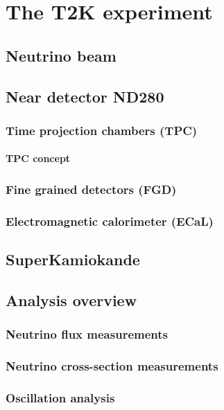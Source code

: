 \documentclass[../main.tex]{subfiles}
\begin{document}
\part{The T2K experiment}

\chapter{Neutrino beam}
\chapter{Near detector ND280}
\section{Time projection chambers (TPC)}
\subsection{TPC concept}
\section{Fine grained detectors (FGD)}
\section{Electromagnetic calorimeter (ECaL)}
\chapter{SuperKamiokande}
\chapter{Analysis overview}
\section{Neutrino flux measurements}
\section{Neutrino cross-section measurements}
\section{Oscillation analysis}
\end{document}
